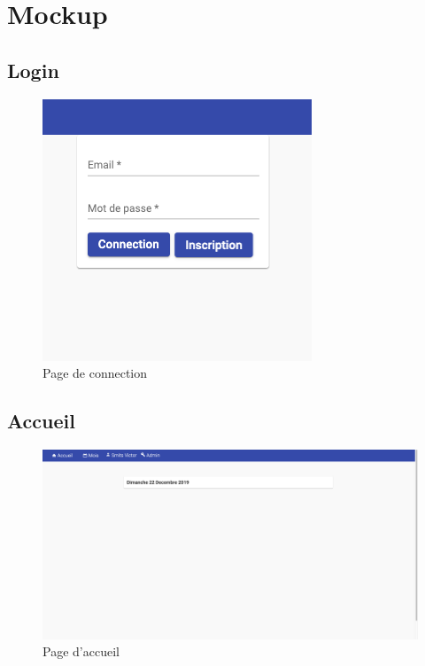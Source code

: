\newpage
\section{Mockup}
	\subsection{Login}
		\begin{figure}[!htbp]
       	 	\includegraphics[width=0.5\linewidth, center]{Mockup/Login.png}
       	 	\caption{Page de connection}
       	\end{figure}
       	
    \vspace{\baselineskip}
	\subsection{Accueil}
		\begin{figure}[!htbp]
       	 	\includegraphics[width=0.8\linewidth, center]{Mockup/Accueil.png}
       	 	\caption{Page d'accueil}
       	\end{figure}
       	
       	
	\newpage
